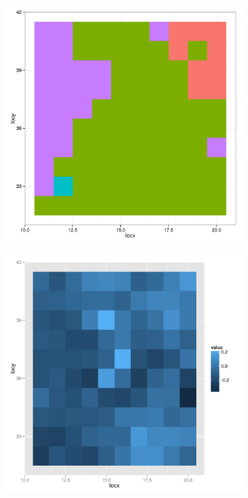 \begin{figure}
        \centering 
         \begin{subfigure}[b]{0.3\textwidth}
                \centering
                \includegraphics[width=\textwidth]{Images-future-work/region6-vegetation-map-nolegend.pdf}
        \end{subfigure}%
        \begin{subfigure}[b]{0.3\textwidth}
                \centering
                \includegraphics[width=\textwidth]{Images-future-work/coef1-spatial.pdf}

\end{subfigure}
\end{figure}
